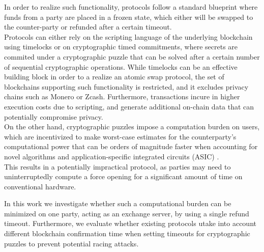 \documentclass{article}      	%
\begin{document}
In order to realize such functionality, protocols follow a standard blueprint where funds from a party are placed in a frozen state, which either will be swapped to the counter-party or refunded after a certain timeout. \\
Protocols can either rely on the scripting language of the underlying blockchain using timelocks or on cryptographic timed commitments, where secrets are commited under a cryptographic puzzle that can be solved after a certain number of sequential cryptographic operations. 
While timelocks can be an effective building block in order to a realize an atomic swap protocol, the set of blockchains supporting such functionality is restricted, and it excludes privacy chains such as Monero or Zcash. Furthermore, transactions incure in higher execution costs due to scripting, and generate additional on-chain data that can potentially compromise privacy. \\
On the other hand, cryptographic puzzles impose a computation burden on users, which are incentivized to make worst-case estimates for the counterparty's computational power that can be orders of magnitude faster when accounting for novel algorithms \cite{squaring_algo} and application-specific integrated circuits (ASIC) \cite{squaring_asic}. \\
This results in a potentially impractical protocol, as parties may need to uninterruptedly compute a force opening for a significant amount of time on conventional hardware.

In this work we investigate whether such a computational burden can be minimized on one party, acting as an exchange server, by using a single refund timeout. Furthermore, we evaluate whether existing protocols utake into account different blockchain confirmation time when setting timeouts for cryptographic puzzles to prevent potential racing attacks.
\end{document}
